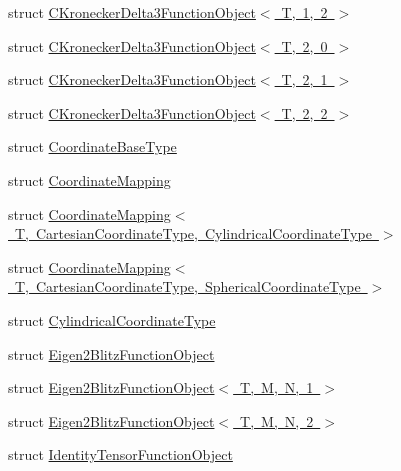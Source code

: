 \begin{DoxyCompactItemize}
\item 
struct \mbox{\hyperlink{structmpc_1_1utilities_1_1_c_kronecker_delta3_function_object_3_01_t_00_011_00_012_01_4}{C\+Kronecker\+Delta3\+Function\+Object$<$ T, 1, 2 $>$}}
\item 
struct \mbox{\hyperlink{structmpc_1_1utilities_1_1_c_kronecker_delta3_function_object_3_01_t_00_012_00_010_01_4}{C\+Kronecker\+Delta3\+Function\+Object$<$ T, 2, 0 $>$}}
\item 
struct \mbox{\hyperlink{structmpc_1_1utilities_1_1_c_kronecker_delta3_function_object_3_01_t_00_012_00_011_01_4}{C\+Kronecker\+Delta3\+Function\+Object$<$ T, 2, 1 $>$}}
\item 
struct \mbox{\hyperlink{structmpc_1_1utilities_1_1_c_kronecker_delta3_function_object_3_01_t_00_012_00_012_01_4}{C\+Kronecker\+Delta3\+Function\+Object$<$ T, 2, 2 $>$}}
\item 
struct \mbox{\hyperlink{structmpc_1_1utilities_1_1_coordinate_base_type}{Coordinate\+Base\+Type}}
\item 
struct \mbox{\hyperlink{structmpc_1_1utilities_1_1_coordinate_mapping}{Coordinate\+Mapping}}
\item 
struct \mbox{\hyperlink{structmpc_1_1utilities_1_1_coordinate_mapping_3_01_t_00_01_cartesian_coordinate_type_00_01_cylindrical_coordinate_type_01_4}{Coordinate\+Mapping$<$ T, Cartesian\+Coordinate\+Type, Cylindrical\+Coordinate\+Type $>$}}
\item 
struct \mbox{\hyperlink{structmpc_1_1utilities_1_1_coordinate_mapping_3_01_t_00_01_cartesian_coordinate_type_00_01_spherical_coordinate_type_01_4}{Coordinate\+Mapping$<$ T, Cartesian\+Coordinate\+Type, Spherical\+Coordinate\+Type $>$}}
\item 
struct \mbox{\hyperlink{structmpc_1_1utilities_1_1_cylindrical_coordinate_type}{Cylindrical\+Coordinate\+Type}}
\item 
struct \mbox{\hyperlink{structmpc_1_1utilities_1_1_eigen2_blitz_function_object}{Eigen2\+Blitz\+Function\+Object}}
\item 
struct \mbox{\hyperlink{structmpc_1_1utilities_1_1_eigen2_blitz_function_object_3_01_t_00_01_m_00_01_n_00_011_01_4}{Eigen2\+Blitz\+Function\+Object$<$ T, M, N, 1 $>$}}
\item 
struct \mbox{\hyperlink{structmpc_1_1utilities_1_1_eigen2_blitz_function_object_3_01_t_00_01_m_00_01_n_00_012_01_4}{Eigen2\+Blitz\+Function\+Object$<$ T, M, N, 2 $>$}}
\item 
struct \mbox{\hyperlink{structmpc_1_1utilities_1_1_identity_tensor_function_object}{Identity\+Tensor\+Function\+Object}}

\end{DoxyCompactItemize}
